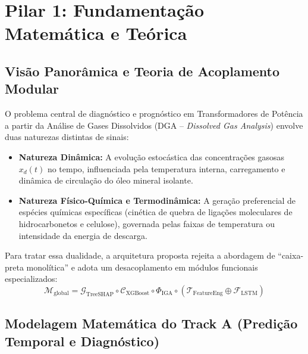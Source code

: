\documentclass[11pt,a4paper]{article}
\begin{document}
\vspace{0.3cm}
\tableofcontents
\vspace{0.5cm}
\newpage

\section{Pilar 1: Fundamentação Matemática e Teórica}

\subsection{Visão Panorâmica e Teoria de Acoplamento Modular}
O problema central de diagnóstico e prognóstico em Transformadores de Potência a partir da Análise de Gases Dissolvidos (DGA -- \textit{Dissolved Gas Analysis}) envolve duas naturezas distintas de sinais:
\begin{itemize}
  \item \textbf{Natureza Dinâmica:} A evolução estocástica das concentrações gasosas $x_d(t)$ no tempo, influenciada pela temperatura interna, carregamento e dinâmica de circulação do óleo mineral isolante.
  \item \textbf{Natureza Físico-Química e Termodinâmica:} A geração preferencial de espécies químicas específicas (cinética de quebra de ligações moleculares de hidrocarbonetos e celulose), governada pelas faixas de temperatura ou intensidade da energia de descarga.
\end{itemize}

Para tratar essa dualidade, a arquitetura proposta rejeita a abordagem de ``caixa-preta monolítica'' e adota um desacoplamento em módulos funcionais especializados:
\begin{equation}
  \mathcal{M}_{\text{global}} = \mathcal{G}_{\text{TreeSHAP}} \circ \mathcal{C}_{\text{XGBoost}} \circ \Phi_{\text{IGA}} \circ \left( \mathcal{T}_{\text{FeatureEng}} \oplus \mathcal{F}_{\text{LSTM}} \right)
\end{equation}

\subsection{Modelagem Matemática do Track A (Predição Temporal e Diagnóstico)}
\label{sec:mat_track_a}
\end{document}

